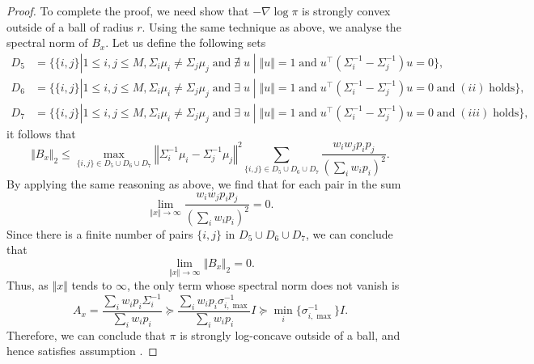 \begin{proof}
To complete the proof, we need show that $-\nabla\log\pi$ is strongly convex outside of a ball of radius $r$. Using the same technique as above, we analyse the spectral norm of $B_x$. Let us define the following sets
\begin{align*}
   D_5 &= \{\{i, j\}|1\leq i, j\leq M, \Sigma_i\mu_i\neq \Sigma_j\mu_j \;\text{and}\; \nexists\; u\; |\;\Vert u\Vert = 1\;\text{and}\; u^\intercal\left(\Sigma_i^{-1}-\Sigma_j^{-1}\right)u = 0\},\\
   D_6 &= \{\{i, j\}|1\leq i, j\leq M, \Sigma_i\mu_i\neq \Sigma_j \mu_j\;\text{and}\; \exists\; u\; |\;\Vert u\Vert = 1\;\text{and}\; u^\intercal\left(\Sigma_i^{-1}-\Sigma_j^{-1}\right)u = 0\;\text{and}\; (ii)\;\text{holds}\},\\
   D_7 &= \{\{i, j\}|1\leq i, j\leq M, \Sigma_i\mu_i\neq \Sigma_j \mu_j\;\text{and}\; \exists\; u\; |\;\Vert u\Vert = 1\;\text{and}\; u^\intercal\left(\Sigma_i^{-1}-\Sigma_j^{-1}\right)u = 0\;\text{and}\; (iii)\;\text{holds}\},
\end{align*}
it follows that
\begin{equation*}
    \Vert B_x\Vert_2 \leq \max_{\{i, j\}\in D_5\cup D_6\cup D_7} \left\Vert \Sigma_i^{-1}\mu_i-\Sigma_j^{-1}\mu_j \right\Vert^2 \sum_{\{i, j\}\in D_5\cup D_6\cup D_7} \frac{ w_iw_j p_i p_j}{(\sum_i w_i p_i)^2}.
\end{equation*}
By applying the same reasoning as above, we find that for each pair in the sum 
\begin{equation*}
    \lim_{\Vert x\Vert\to\infty}\frac{ w_iw_j p_i p_j}{(\sum_i w_i p_i)^2} = 0.
\end{equation*}
Since there is a finite number of pairs $\{i,j\}$ in $D_5\cup D_6\cup D_7$, we can conclude that 
\begin{equation*}
    \lim_{\Vert x\Vert\to\infty}\Vert B_x\Vert_2 = 0.
\end{equation*}
Thus, as $\Vert x\Vert$ tends to $\infty$, the only term whose spectral norm does not vanish is
\begin{equation*}
    A_x = \frac{\sum_i w_i p_i \Sigma_i^{-1}}{\sum_i w_i p_i}\succcurlyeq \frac{\sum_i w_i p_i \sigma_{i, \max}^{-1}}{\sum_i w_i p_i} I \succcurlyeq \min_i\{\sigma_{i, \max}^{-1}\} I.
\end{equation*}
Therefore, we can conclude that $\pi$ is strongly log-concave outside of a ball, and hence satisfies assumption .
\end{proof}
